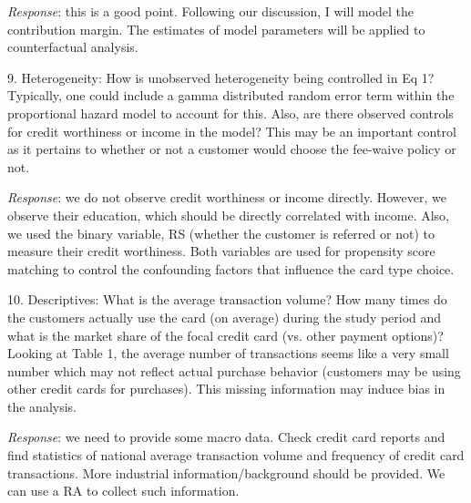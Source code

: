 \documentclass[titlepage,12pt,letterpaper]{article}
\numberwithin{equation}{section}
\begin{document}
\emph{Response}: this is a good point. Following our discussion, I will model the contribution margin. The estimates of model parameters will be applied to counterfactual analysis.  

9.	Heterogeneity: How is unobserved heterogeneity being controlled in Eq 1? Typically, one could include a gamma distributed random error term within the proportional hazard model to account for this. Also, are there observed controls for credit worthiness or income in the model? This may be an important control as it pertains to whether or not a customer would choose the fee-waive policy or not.

\emph{Response}: we do not observe credit worthiness or income directly. However, we observe their education, which should be directly correlated with income. Also, we used the binary variable, RS (whether the customer is referred or not) to measure their credit worthiness. Both variables are used for propensity score matching to control the confounding factors that influence the card type choice.  

10.	Descriptives: What is the average transaction volume? How many times do the customers actually use the card (on average) during the study period and what is the market share of the focal credit card (vs. other payment options)? Looking at Table 1, the average number of transactions seems like a very small number which may not reflect actual purchase behavior (customers may be using other credit cards for purchases). This missing information may induce bias in the analysis.

\emph{Response}: we need to provide some macro data. Check credit card reports and find statistics of national average transaction volume and frequency of credit card transactions. More industrial information/background should be provided. We can use a RA to collect such information. 


\end{document}
